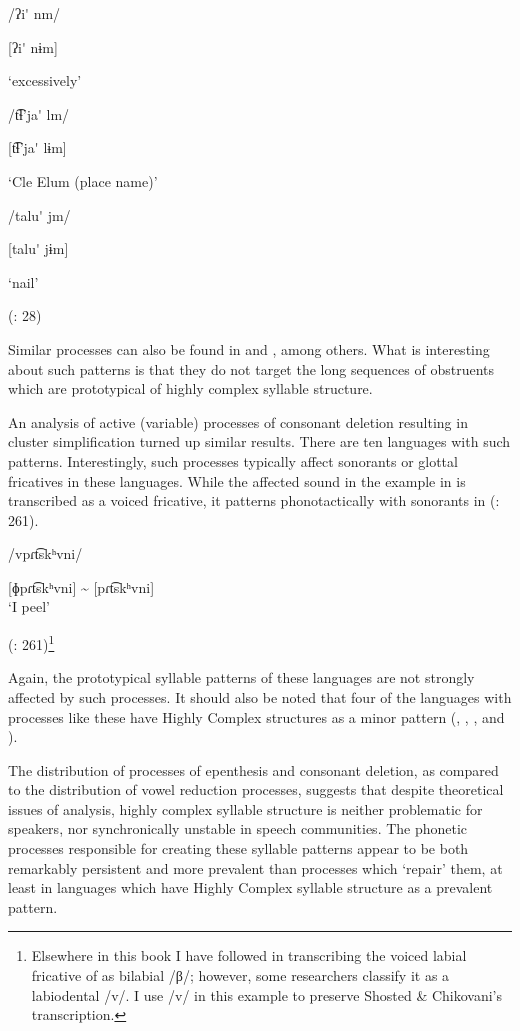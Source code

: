 \ea\label{ex:8.7}

\ea  /ʔi\'{} nm/

  [ʔi\'{} nɨm]

  ‘excessively’

\ex  /t͡ɬ’ja\'{} lm/

  [t͡ɬ’ja\'{} lɨm]

  ‘Cle Elum (place name)’

\ex  /talu\'{} jm/

  [talu\'{} jɨm]

  ‘nail’

(\citealt{HargusBeavert2006}: 28)
\z
\z

Similar processes can also be found in  and , among others. What is interesting about such patterns is that they do not target the long sequences of obstruents which are prototypical of highly complex syllable structure.

  An analysis of active (variable) processes of consonant deletion resulting in cluster simplification turned up similar results. There are ten languages with such patterns. Interestingly, such processes typically affect sonorants or glottal fricatives in these languages. While the affected sound in the example in  is transcribed as a voiced fricative, it patterns phonotactically with sonorants in  (\citealt{ShostedChikovani2006}: 261).

\ea\label{ex:8.8}

/vpɾt͡skʰvni/

[ɸpɾt͡skʰvni] {\textasciitilde} [pɾt͡skʰvni]\\
\glt ‘I peel’

(\citealt{ShostedChikovani2006}: 261)\footnote{{Elsewhere in this book I have followed \citet{Aronson1991} in transcribing the voiced labial fricative of  as bilabial /β/; however, some researchers classify it as a labiodental /v/. I use /v/ in this example to preserve Shosted \& Chikovani’s transcription.}}
\z

Again, the prototypical syllable patterns of these languages are not strongly affected by such processes. It should also be noted that four of the languages with processes like these have Highly Complex structures as a minor pattern (, , , and ).

  The distribution of processes of epenthesis and consonant deletion, as compared to the distribution of vowel reduction processes, suggests that despite theoretical issues of analysis, highly complex syllable structure is neither problematic for speakers, nor synchronically unstable in speech communities. The phonetic processes responsible for creating these syllable patterns appear to be both remarkably persistent and more prevalent than processes which ‘repair’ them, at least in languages which have Highly Complex syllable structure as a prevalent pattern.

